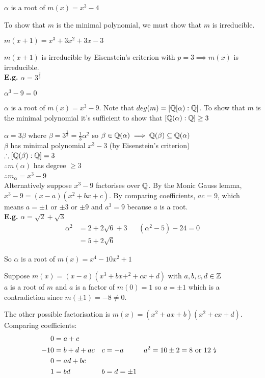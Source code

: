 \documentclass[11pt]{article}
\begin{document}
$\alpha$ is a root of $m(x) = x^3 -4$

To show that $m$ is the minimal polynomial, we must show that $m$ is irreducible.

$m(x+1) = x^3 + 3x^2 +3x-3$

$m(x+1)$ is irreducible by Eisenstein's criterion with $p=3 \implies m(x) $ is irreducible.
$ $\\[1em]
\textbf{E.g.} $\alpha = 3^{\frac{2}{3}} $

$\alpha^3 - 9 = 0$

$\alpha$ is a root of $m(x) = x^3 -9 $.
Note that $deg(m) = [\mathbb{Q}[\alpha):\mathbb{Q}]$.
To show that $m$ is the minimal polynomial it's sufficient to show that $[\mathbb{Q}(\alpha) : \mathbb{Q}] \geq 3$

$\alpha = 3\beta$ where $\beta = 3^{\frac{1}{3}} = \frac{1}{3}\alpha^2$ so $\beta \in \mathbb{Q}(\alpha) \implies \mathbb{Q}(\beta) \subseteq \mathbb{Q}(\alpha)$
$ $\\[-0.5em]

$\beta $ has minimal polynomial $x^3 - 3$ (by Eisenstein's criterion)
$ $\\[-0.5em]

$\therefore [\mathbb{Q}(\beta):\mathbb{Q}] = 3$
$ $\\[-.5em]

$\therefore m(\alpha)$ has degree $\geq 3$
$ $\\[-.5em]

$\therefore m_\alpha = x^3 -9$ 
$ $\\[1em]
Alternatively suppose $x^3 -9$ factorises over $\mathbb{Q}$.
By the Monic Gauss lemma, $x^3 -9 = (x-a)(x^2 +bx+c)$.
By comparing coefficients, $ac=9$, which means $a = \pm 1$ or $\pm 3$ or $\pm 9$ and $a^3 = 9$ because $a$ is a root. \lightning
$ $\\[1em]
\textbf{E.g.} $ \alpha = \sqrt{2} + \sqrt{3} $
\begin{align*}
	\alpha^2 & = 2+2\sqrt{6} +3 && (\alpha^2 - 5) -24 = 0\\
	& = 5 + 2\sqrt{6}
\end{align*}

So $\alpha $ is a root of $m(x) = x^4 - 10x^2 + 1$

Suppose $m(x) = (x-a)(x^3+bx+^2+cx+d) $ with $a,b,c,d \in \mathbb{Z}$
$ $\\

$a $ is a root of $m$ and $a$ is a factor of $m(0) = 1$ so $a = \pm 1$ which is a contradiction since $m(\pm 1) = -8 \neq 0.$

The other possible factorisation is $m(x) = (x^2 + ax+b)(x^2+cx+d)$.
Comparing coefficients:
\begin{align*}
	0 &= a+c && \\
	-10 &= b+d+ac && c = -a &&a^2 = 10 \pm 2 = 8 \text{ or } 12 \text{ \lightning} \\ 
	0 &= ad+bc\\
	1 &= bd && b=d=\pm 1\\
\end{align*}
\end{document}

